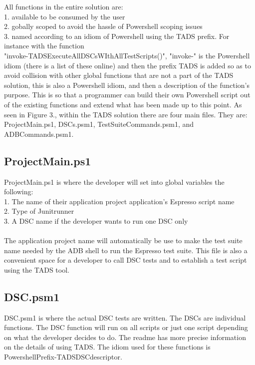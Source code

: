 All functions in the entire solution are:\\1. available to be consumed by the user\\ 2. gobally scoped to avoid the hassle of Powershell scoping issues \\ 3. named according to an idiom of Powershell using the TADS prefix.  For instance with the function \\"invoke-TADSExecuteAllDSCsWIthAllTestScripts()", "invoke-" is the Powershell idiom (there is a list of these online) and then the prefix TADS is added so as to avoid collision with other global functions that are not a part of the TADS solution, this is also a Powershell idiom, and then a description of the function's purpose. This is so that a programmer can build their own Powershell script out of the existing functions and extend what has been made up to this point.  
As seen in Figure 3., within the TADS solution there are four main files.  They are: ProjectMain.ps1, DSCs.psm1, TestSuiteCommands.psm1, and ADBCommands.psm1.  

\subsection{ProjectMain.ps1}

ProjectMain.ps1 is where the developer will set into global variables the following: \\1. The name of their application project application's Espresso script name\\ 2. Type of Junitrunner \\3. A DSC name if the developer wants to run one DSC only \\ \\The application project name will automatically be use to make the test suite name needed by the ADB shell to run the Espresso test suite. This file is also a convenient space for a developer to call DSC tests and to establish a test script using the TADS tool.

\subsection{DSC.psm1}

DSC.psm1 is where the actual DSC tests are written.  The DSCs are individual functions.  The DSC function will run on all scripts or just one script depending on what the developer decides to do. The readme has more precise information on the details of using TADS.  The idiom used for these functions is PowershellPrefix-TADSDSCdescriptor.
 
